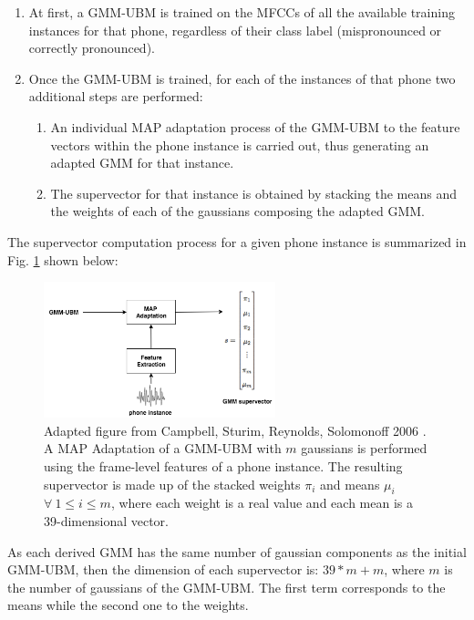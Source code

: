 \begin{enumerate}
  \item At first, a GMM-UBM is trained on the MFCCs
  of all the available training instances for that phone, regardless of their class
  label (mispronounced or correctly pronounced).
  \item Once the GMM-UBM is trained, for each of the instances of
  that phone two additional steps are performed:
    \begin{enumerate}
      \item An individual MAP adaptation process of the GMM-UBM to
      the feature vectors within the phone instance
      is carried out, thus generating an adapted GMM for that instance.
      \item The supervector for that instance
      is obtained by stacking the means and the weights of each of the
      gaussians composing the adapted GMM.
    \end{enumerate}
\end{enumerate}

The supervector computation process for a given phone instance
is summarized in Fig. \ref{fig:supervectors_extraction} shown below:

\begin{figure}[H]
  \centering
  \includegraphics[width=0.6\textwidth]{files/figures/method/supervectors_extraction}
  \caption{
    Adapted figure from Campbell, Sturim, Reynolds, Solomonoff 2006 \cite{supervectors}.
    A MAP Adaptation of a GMM-UBM with $m$ gaussians
    is performed using the frame-level features of a phone instance.
    The resulting supervector is made up of the stacked weights $\pi_{i}$ and means
    $\mu_{i}$ $\forall \ 1 \leq i \leq m$, where each weight is a real value and each
    mean is a 39-dimensional vector.
  }
  \label{fig:supervectors_extraction}
\end{figure}

As each derived GMM has the same number of gaussian components as the initial GMM-UBM,
then the dimension
of each supervector is: $39*m + m$, where $m$ is the number of gaussians of the GMM-UBM. The
first term corresponds to the means while the second one to the weights.

